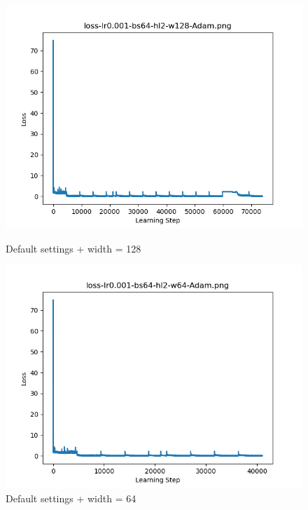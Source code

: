 \documentclass{article}[12pt]
\begin{document}
    \begin{figure}[H]
        \includegraphics[width=\linewidth]{testsResults/loss/w/def.png}
        \caption{Default settings + width = 128}
        \endminipage\hfill
        \includegraphics[width=\linewidth]{testsResults/loss/w/loss-lr0.001-bs64-hl2-w64-Adam.png}
        \caption{Default settings + width = 64}
        \endminipage
    \end{figure}
\end{document}

